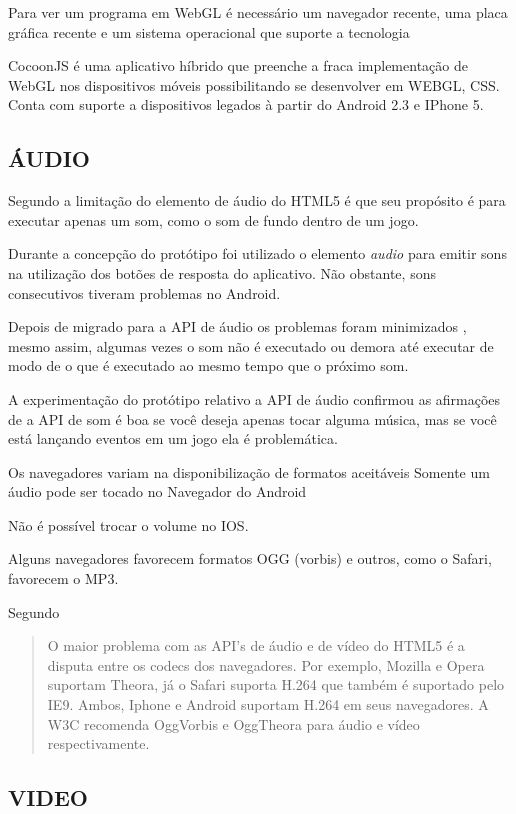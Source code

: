 Para ver um programa em WebGL é necessário um navegador recente, uma
placa gráfica recente e um sistema operacional que suporte a tecnologia
\autocite{html5mostwanted}

CocoonJS é uma aplicativo híbrido que preenche a fraca implementação
de WebGL nos dispositivos móveis possibilitando se desenvolver em
WEBGL, CSS. Conta com suporte a dispositivos legados à partir do
Android 2.3 e IPhone 5.

\subsection{ÁUDIO}

Segundo \cite{html5mostwanted} a limitação do elemento de áudio do
HTML5 é que seu propósito é para executar apenas um som, como o som
de fundo dentro de um jogo.

Durante a concepção do protótipo foi utilizado o elemento \textit{audio} para
emitir sons na utilização dos botões de resposta do aplicativo. Não
obstante, sons consecutivos tiveram problemas no Android. 

Depois de migrado para a API de áudio os problemas foram minimizados
, mesmo assim, algumas vezes o som não é executado ou demora até
executar de modo de o que é executado ao mesmo tempo que o próximo
som.

A experimentação do protótipo relativo a API de áudio confirmou as
afirmações de \cite{html5mostwanted} a API de som é boa se você
deseja apenas tocar alguma música, mas se você está lançando eventos
em um jogo ela é problemática.

Os navegadores variam na disponibilização de formatos aceitáveis
Somente um áudio pode ser tocado no Navegador do Android

Não é possível trocar o volume no IOS.

Alguns navegadores favorecem formatos OGG (vorbis) e outros, como o
Safari, favorecem o MP3.

Segundo \cite{html5Tradeoffs}
\begin{quote}
O maior problema com as API's de áudio e de vídeo do HTML5 é
a disputa entre os codecs dos navegadores. Por exemplo, Mozilla e
Opera suportam Theora, já o Safari suporta H.264 que também é
suportado pelo IE9. Ambos, Iphone e Android suportam H.264 em seus
navegadores. A W3C recomenda OggVorbis e OggTheora para áudio e vídeo
respectivamente.
\end{quote}

\subsection{VIDEO}

